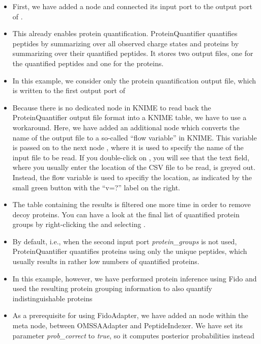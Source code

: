 \begin{itemize}
\item First, we have added a  node and connected its input port to the output port of .
\item This already enables protein quantification. ProteinQuantifier quantifies peptides by summarizing over all observed charge states and proteins
by summarizing over their quantified peptides. It stores two output files, one for the quantified peptides and one for the proteins.
\item In this example, we consider only the protein quantification output file, which is written to the first output port of 
\item Because there is no dedicated node in KNIME to read back the ProteinQuantifier output file format into a KNIME table, we have to use a workaround.
Here, we have added an additional
 node which converts the name of the output file to a so-called ``flow variable'' in KNIME. This variable is passed on
to the next node , where it is used to specify the name of the input file to be read. If you double-click on ,
you will see that the text field, where you usually enter the location of the CSV file to be read, is greyed out. Instead, the flow variable is used
to specifiy the location, as indicated by the small green button with the ``v=?'' label on the right.
\item The table containing the  results is filtered one more time in order to remove decoy proteins. You can have a look
at the final list of quantified protein groups by right-clicking the  and selecting .
\item By default, i.e., when the second input port \textit{protein\_groups} is not used, ProteinQuantifier quantifies proteins using only the unique peptides,
which usually results in rather low numbers of quantified proteins.
\item In this example, however, we have performed protein inference using Fido and used the resulting protein grouping information to also quantify
indistinguishable proteins
\item As a prerequisite for using FidoAdapter, we have added an  node within the  meta node, between
OMSSAAdapter and PeptideIndexer. We have set its parameter \textit{prob\_correct} to \textit{true}, so it computes posterior probabilities instead

\end{itemize}
